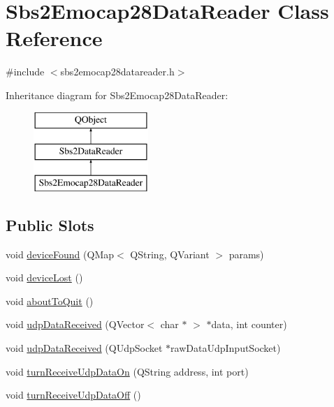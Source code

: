 \hypertarget{classSbs2Emocap28DataReader}{\section{Sbs2\-Emocap28\-Data\-Reader Class Reference}
\label{classSbs2Emocap28DataReader}
}


{\ttfamily \#include $<$sbs2emocap28datareader.\-h$>$}

Inheritance diagram for Sbs2\-Emocap28\-Data\-Reader\-:\begin{figure}[H]
\begin{center}
\leavevmode
\includegraphics[height=3.000000cm]{classSbs2Emocap28DataReader}
\end{center}
\end{figure}
\subsection*{Public Slots}
\begin{DoxyCompactItemize}
\item 
void \hyperlink{classSbs2Emocap28DataReader_ab845451927a5b0183730f3eb5a09f146}{device\-Found} (Q\-Map$<$ Q\-String, Q\-Variant $>$ params)
\item 
void \hyperlink{classSbs2Emocap28DataReader_ae8677a65973a4ee21ff2b0103a1e4c2e}{device\-Lost} ()
\item 
void \hyperlink{classSbs2Emocap28DataReader_a5ff03b12f1c22a5a35f77cdcb627526e}{about\-To\-Quit} ()
\item 
void \hyperlink{classSbs2Emocap28DataReader_a3670f62d390b425f58dc328d887f4e40}{udp\-Data\-Received} (Q\-Vector$<$ char $\ast$ $>$ $\ast$data, int counter)
\item 
void \hyperlink{classSbs2Emocap28DataReader_a0a5161afb5e369562c58c5630ed021f8}{udp\-Data\-Received} (Q\-Udp\-Socket $\ast$raw\-Data\-Udp\-Input\-Socket)
\item 
void \hyperlink{classSbs2Emocap28DataReader_a9bf0852e3e8a66e3d852a53397a034fc}{turn\-Receive\-Udp\-Data\-On} (Q\-String address, int port)
\item 
void \hyperlink{classSbs2Emocap28DataReader_ae5dce4cfc0e8e50af6b2e6c87ba212e1}{turn\-Receive\-Udp\-Data\-Off} ()
\end{DoxyCompactItemize}
